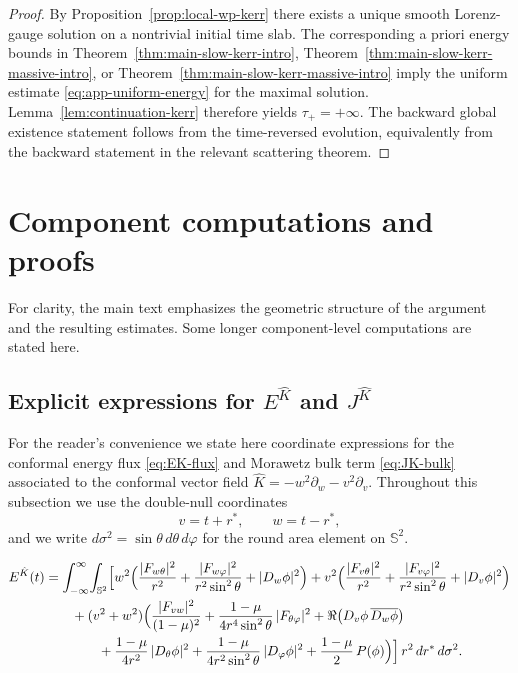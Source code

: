 \documentclass[11pt]{article}
\numberwithin{equation}{section}
\theoremstyle{plain}
\theoremstyle{definition}
\theoremstyle{remark}
\begin{document}
\begin{proof}
By Proposition~\ref{prop:local-wp-kerr} there exists a unique smooth Lorenz-gauge solution on a nontrivial initial time slab.
The corresponding a priori energy bounds in Theorem~\ref{thm:main-slow-kerr-intro}, Theorem~\ref{thm:main-slow-kerr-massive-intro}, or Theorem~\ref{thm:main-slow-kerr-massive-intro} imply the uniform estimate \eqref{eq:app-uniform-energy} for the maximal solution.
Lemma~\ref{lem:continuation-kerr} therefore yields $\tau_+=+\infty$.
The backward global existence statement follows from the time-reversed evolution, equivalently from the backward statement in the relevant scattering theorem.
\end{proof}


\section{Component computations and proofs}
\label{app:component-proofs}

For clarity, the main text emphasizes the geometric structure of the argument and the resulting estimates. Some longer component-level computations are stated here.



\subsection{Explicit expressions for \texorpdfstring{$E^{\hat K}$ and $J^{\hat K}$}{E\textasciicircum K and J\textasciicircum K}}
\label{app:EK-JK}

For the reader's convenience we state here coordinate expressions for the conformal energy flux \eqref{eq:EK-flux} and Morawetz bulk term \eqref{eq:JK-bulk} associated to the conformal vector field $\hat K=-w^{2}\partial_{w}-v^{2}\partial_{v}$.
Throughout this subsection we use the double-null coordinates
\begin{equation}
v=t+r^{\ast},\qquad w=t-r^{\ast},
\end{equation}
and we write $d\sigma^{2}=\sin\theta\,d\theta\,d\varphi$ for the round area element on $\mathbb S^{2}$.

\begin{eqnarray}\label{EK}
E^{\hat K}(t)
&=
\int_{-\infty}^{\infty}\!\int_{\mathbb S^{2}}
\Bigl[
w^{2}\Bigl(
\frac{|F_{w\theta}|^{2}}{r^{2}}
+\frac{|F_{w\varphi}|^{2}}{r^{2}\sin^{2}\theta}
+|D_{w}\phi|^{2}
\Bigr)
+v^{2}\Bigl(
\frac{|F_{v\theta}|^{2}}{r^{2}}
+\frac{|F_{v\varphi}|^{2}}{r^{2}\sin^{2}\theta}
+|D_{v}\phi|^{2}
\Bigr)
\nonumber\\
&\qquad
+(v^{2}+w^{2})\Bigl(
\frac{|F_{vw}|^{2}}{(1-\mu)^{2}}
+\frac{1-\mu}{4r^{4}\sin^{2}\theta}\,|F_{\theta\varphi}|^{2}
+\Re\bigl(D_{v}\phi\,\overline{D_{w}\phi}\bigr)
\nonumber\\
&\qquad\qquad
+\frac{1-\mu}{4r^{2}}\,|D_{\theta}\phi|^{2}
+\frac{1-\mu}{4r^{2}\sin^{2}\theta}\,|D_{\varphi}\phi|^{2}
+\frac{1-\mu}{2}\,P(\phi)
\Bigr)
\Bigr]\,r^{2}\,dr^{\ast}\,d\sigma^{2}.
\end{eqnarray}
\end{document}
